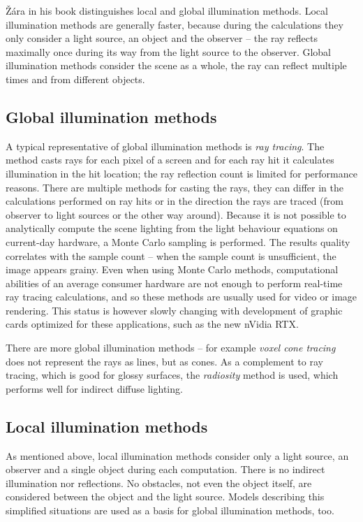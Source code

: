 Žára in his book \cite{ZaraJiri2004Mpg} distinguishes local and global illumination methods. Local illumination methods are generally faster, because during the calculations they only consider a light source, an object and the observer -- the ray reflects maximally once during its way from the light source to the observer. Global illumination methods consider the scene as a whole, the ray can reflect multiple times and from different objects.

\subsection{Global illumination methods}
A typical representative of global illumination methods is \textit{ray tracing}. The method casts rays for each pixel of a screen and for each ray hit it calculates illumination in the hit location; the ray reflection count is limited for performance reasons. There are multiple methods for casting the rays, they can differ in the calculations performed on ray hits or in the direction the rays are traced (from observer to light sources or the other way around). Because it is not possible to analytically compute the scene lighting from the light behaviour equations on current-day hardware, a Monte Carlo sampling is performed. The results quality correlates with the sample count -- when the sample count is unsufficient, the image appears grainy. Even when using Monte Carlo methods, computational abilities of an average consumer hardware are not enough to perform real-time ray tracing calculations, and so these methods are usually used for video or image rendering. This status is however slowly changing with development of graphic cards optimized for these applications, such as the new nVidia RTX\texttrademark  \cite{2018NRTR}.

There are more global illumination methods -- for example \textit{voxel cone tracing} \cite{CrassinCyril2011IIIU} does not represent the rays as lines, but as cones. As a complement to ray tracing, which is good for glossy surfaces, the \textit{radiosity} method is used, which performs well for indirect diffuse lighting.

\subsection{Local illumination methods}
As mentioned above, local illumination methods consider only a light source, an observer and a single object during each computation. There is no indirect illumination nor reflections. No obstacles, not even the object itself, are considered between the object and the light source. Models describing this simplified situations are used as a basis for global illumination methods, too.

